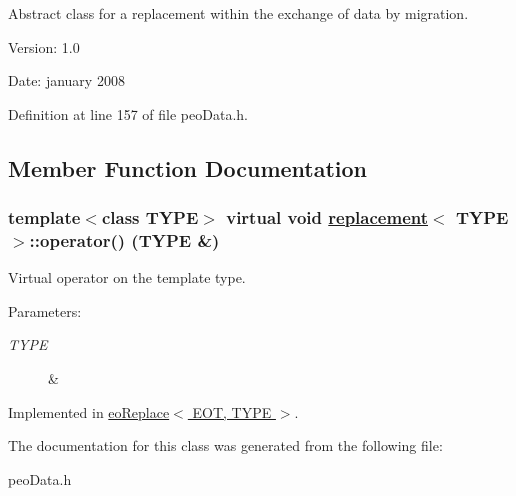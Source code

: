 Abstract class for a replacement within the exchange of data by migration. 

\begin{Desc}
\item[Version:]1.0 \end{Desc}
\begin{Desc}
\item[Date:]january 2008 \end{Desc}




Definition at line 157 of file peo\-Data.h.

\subsection{Member Function Documentation}
\hypertarget{classreplacement_2c21feaad602bb9d691f0081ac4363b1}{
\subsubsection[operator()]{\setlength{\rightskip}{0pt plus 5cm}template$<$class TYPE$>$ virtual void \hyperlink{classreplacement}{replacement}$<$ TYPE $>$::operator() (TYPE \&)}}
\label{classreplacement_2c21feaad602bb9d691f0081ac4363b1}


Virtual operator on the template type. 

\begin{Desc}
\item[Parameters:]
\begin{description}
\item[{\em TYPE}]\& \end{description}
\end{Desc}


Implemented in \hyperlink{classeoReplace_786659edbd9907000138aa29caf46065}{eo\-Replace$<$ EOT, TYPE $>$}.

The documentation for this class was generated from the following file:\begin{CompactItemize}
\item 
peo\-Data.h\end{CompactItemize}
